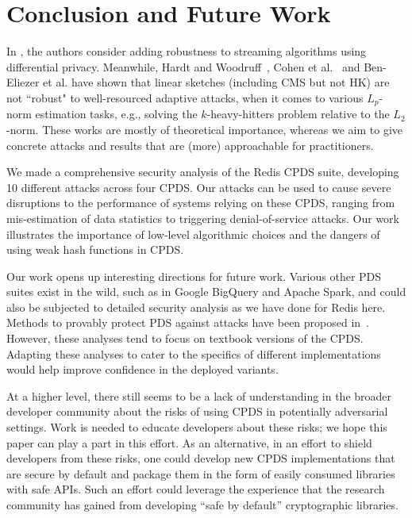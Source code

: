\chapter{Conclusion and Future Work}\label{chap:conclusion}


In \cite{HassidimKMMS20}, the authors consider adding robustness to streaming algorithms using differential privacy.
Meanwhile, Hardt and Woodruff~\cite{hardt2013}, Cohen et al.~\cite{cohen2022robust} and Ben-Eliezer et al.\cite{BenEliezer2022} have shown that linear sketches (including CMS but not HK) are not ``robust" to well-resourced adaptive attacks, when it comes to various $L_p$-norm estimation tasks, e.g., solving the $k$-heavy-hitters problem relative to the $L_2$-norm.  
These works are mostly of theoretical importance, whereas we aim to give concrete  attacks and results that are (more) approachable for practitioners.

We made a comprehensive security analysis of the Redis CPDS suite, developing 10 different attacks across four CPDS. 
Our attacks can be used to cause severe disruptions to the performance of systems relying on these CPDS, ranging from mis-estimation of data statistics to triggering denial-of-service attacks. 
Our work illustrates the importance of low-level algorithmic choices and the dangers of using weak hash functions in CPDS. 

Our work opens up interesting directions for future work. Various other PDS suites exist in the wild, such as in Google BigQuery and Apache Spark, and could also be subjected to detailed security analysis as we have done for Redis here. 
Methods to provably protect PDS against attacks have been proposed in~\cite{NaorY15,clayton2019,FPUV22,PatersonR22}. However, these analyses tend to focus on textbook versions of the CPDS. 
Adapting these analyses to cater to the specifics of different implementations would help improve confidence in the deployed variants.

At a higher level, there still seems to be a lack of understanding  in the broader developer community about the risks of using CPDS in potentially adversarial settings. 
Work is needed to educate developers about these risks; we hope this paper can play a part in this effort. 
As an alternative, in an effort to shield developers from these risks, one could develop new CPDS implementations that are secure by default and package them in the form of easily consumed libraries with safe APIs. Such an effort could leverage the experience that the research community has gained from developing ``safe by default'' cryptographic libraries.

